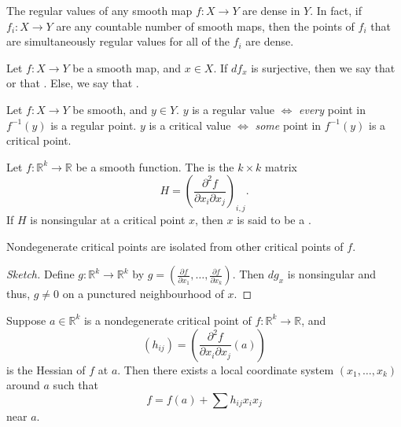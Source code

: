 \begin{cor}
	The regular values of any smooth map $f : X \to Y$ are dense in $Y$. In fact, if $f_{i} : X \to Y$ are any countable number of smooth maps, then the points of $f_{i}$ that are simultaneously regular values for all of the $f_{i}$ are dense.
\end{cor}

\begin{defn}
	Let $f : X \to Y$ be a smooth map, and $x \in X$. \newline
	If $df_{x}$ is surjective, then we say that  or that . Else, we say that .
\end{defn}

\begin{rem}
	Let $f : X \to Y$ be smooth, and $y \in Y$. \newline
	$y$ is a regular value $\Leftrightarrow$ \emph{every} point in $f^{-1}(y)$ is a regular point. \newline
	$y$ is a critical value $\Leftrightarrow$ \emph{some} point in $f^{-1}(y)$ is a critical point. 
\end{rem}

\begin{defn}
	Let $f : \mathbb{R}^{k} \to \mathbb{R}$ be a smooth function. The  is the $k \times k$ matrix
	\begin{equation*} 
		H = \left(\frac{\partial^{2} f}{\partial x_{i} \partial x_{j}}\right)_{i, j}.
	\end{equation*}
	If $H$ is nonsingular at a critical point $x$, then $x$ is said to be a .
\end{defn}

\begin{prop}
	Nondegenerate critical points are isolated from other critical points of $f$.
\end{prop}
\begin{proof}[Sketch]
	Define $g : \mathbb{R}^{k} \to \mathbb{R}^{k}$ by $g = \left(\frac{\partial f}{\partial x_{1}}, \ldots, \frac{\partial f}{\partial x_{k}}\right)$. \newline
	Then $dg_{x}$ is nonsingular and thus, $g \neq 0$ on a punctured neighbourhood of $x$.
\end{proof}

\begin{thm}
	Suppose $a \in \mathbb{R}^{k}$ is a nondegenerate critical point of $f : \mathbb{R}^{k} \to \mathbb{R}$, and
	\begin{equation*} 
		(h_{ij}) = \left(\frac{\partial^{2} f}{\partial x_{i} \partial x_{j}}(a)\right)
	\end{equation*}
	is the Hessian of $f$ at $a$. Then there exists a local coordinate system $(x_{1}, \ldots, x_{k})$ around $a$ such that
	\begin{equation*} 
		f = f(a) + \sum h_{ij} x_{i} x_{j}
	\end{equation*}
	near $a$.
\end{thm}

